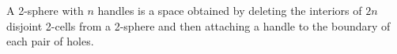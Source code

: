 A 2-sphere with $n$ handles is a space obtained by deleting the interiors of $2n$ disjoint 2-cells from a 2-sphere and then attaching a handle to the boundary of each pair of holes.
